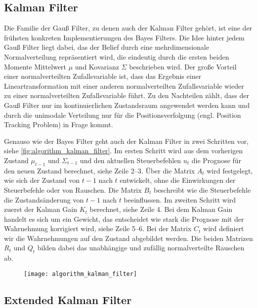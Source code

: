 \subsection{Kalman Filter}

Die Familie der Gauß Filter, zu denen auch der Kalman Filter gehört, ist eine der frühsten konkreten Implementierungen des Bayes Filters. Die Idee hinter jedem Gauß Filter liegt dabei, das der Belief durch eine mehrdimensionale Normalverteilung repräsentiert wird, die eindeutig durch die ersten beiden Momente Mittelwert $\mu$ und Kovarianz $\Sigma$ beschrieben wird. Der große Vorteil einer normalverteilten Zufallsvariable ist, dass das Ergebnis einer Lineartransformation mit einer anderen normalverteilten Zufallsvariable wieder zu einer normalverteilten Zufallsvariable führt. Zu den Nachteilen zählt, dass der Gauß Filter nur im kontinuierlichen Zustandsraum angewendet werden kann und durch die unimodale Verteilung nur für die Positionsverfolgung (engl. Position Tracking Problem) in Frage kommt.

Genauso wie der Bayes Filter geht auch der Kalman Filter in zwei Schritten vor, siehe \autoref{fig:algorithm_kalman_filter}. Im ersten Schritt wird aus dem vorherigen Zustand $\mu_{t-1}$ und $\Sigma_{t-1}$ und den aktuellen Steuerbefehlen $u_t$ die Prognose für den neuen Zustand berechnet, siehe Zeile 2--3. Über die Matrix $A_t$ wird festgelegt, wie sich der Zustand von $t-1$ nach $t$ entwickelt, ohne die Einwirkungen der Steuerbefehle oder von Rauschen. Die Matrix $B_t$ beschreibt wie die Steuerbefehle die Zustandsänderung von $t-1$ nach $t$ beeinflussen. Im zweiten Schritt wird zuerst der Kalman Gain $K_t$ berechnet, siehe Zeile 4. Bei dem Kalman Gain handelt es sich um ein Gewicht, das entscheidet wie stark die Prognose mit der Wahrnehmung korrigiert wird, siehe Zeile 5--6. Bei der Matrix $C_t$ wird definiert wir die Wahrnehmungen auf den Zustand abgebildet werden. Die beiden Matrizen $R_t$ und $Q_t$ bilden dabei das unabhängige und zufällig normalverteilte Rauschen ab.

\begin{figure}
	\centering
	\texttt{[image: algorithm\_kalman\_filter]}
	\label{fig:algorithm_kalman_filter}
\end{figure}


%
%
%
\subsection{Extended Kalman Filter}

